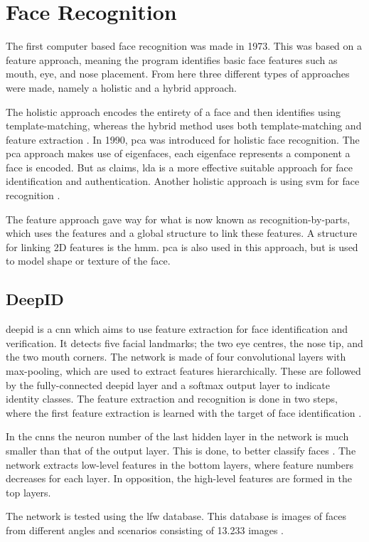 \section{Face Recognition}
The first computer based face recognition was made in 1973. This was based on a feature approach, meaning the program identifies basic face features such as mouth, eye, and nose placement. 
From here three different types of approaches were made, namely a holistic and a hybrid approach. 

The holistic approach encodes the entirety of a face and then identifies using template-matching, whereas the hybrid method uses both template-matching and feature extraction \citep{Wechsler2007}.
In 1990, \gls{pca} was introduced for holistic face recognition. The \gls{pca} approach makes use of eigenfaces, each eigenface represents a component a face is encoded. But as \cite{Wechsler2007} claims, \gls{lda} is a more effective suitable approach for face identification and authentication. Another holistic approach is using \gls{svm} for face recognition \citep{Wechsler2007}.

The feature approach gave way for what is now known as recognition-by-parts, which uses the features and a global structure to link these features. A structure for linking 2D features is the \gls{hmm}. \gls{pca} is also used in this approach, but is used to model shape or texture of the face.

\subsection{DeepID}
\gls{deepid} is a \gls{cnn} which aims to use feature extraction for face identification and verification. It detects five facial landmarks; the two eye centres, the nose tip, and the two mouth corners. The network is made of four convolutional layers with max-pooling, which are used to extract features hierarchically. These are followed by the fully-connected \gls{deepid} layer and a softmax output layer to indicate identity classes. The feature extraction and recognition is done in two steps, where the first feature extraction is learned with the target of face identification \citep{deepID2014}.

In the \gls{cnn}s the neuron number of the last hidden layer in the network is much smaller than that of the output layer. This is done, to better classify faces \citep{deepID2014}. The network extracts low-level features in the bottom layers, where feature numbers decreases for each layer. In opposition, the high-level features are formed in the top layers.

The network is tested using the \gls{lfw} database. This database is images of faces from different angles and scenarios consisting of 13.233 images \citep{lfw2007}.
